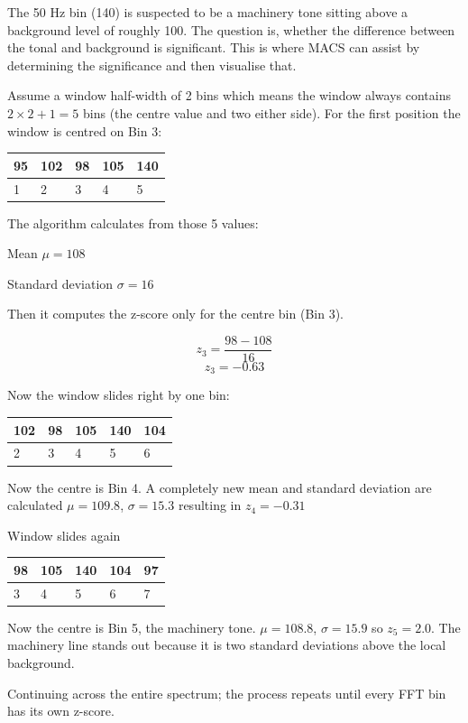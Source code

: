 The 50 Hz bin (140) is suspected to be a machinery tone sitting above a background level of roughly 100. The question is, whether the difference between the tonal and background is significant. This is where MACS can assist by determining the significance and then visualise that.

Assume a window half-width of 2 bins which means the window always contains $2 \times 2 + 1 = 5$ bins (the centre value and two either side). For the first position the window is centred on Bin 3:

 \begin{tabular}{lllll}
    95 & 102 & 98 & 105 & 140 \\
    \hline
    1 & 2 & 3 & 4 & 5
 \end{tabular}

The algorithm calculates from those 5 values:
\begin{compactitem}
    \item Mean $\mu = 108$
    \item Standard deviation $\sigma = 16$
\end{compactitem}

Then it computes the z-score only for the centre bin (Bin 3).

\[
z_{3} = \frac{98 - 108}{16}
\]
\[
z_{3} = -0.63
\] 

Now the window slides right by one bin:

 \begin{tabular}{lllll}
    102 & 98 & 105 & 140 & 104 \\
    \hline
    2 & 3 & 4 & 5 & 6
 \end{tabular}

Now the centre is Bin 4. A completely new mean and standard deviation are calculated $\mu = 109.8$, $\sigma = 15.3$ resulting in $z_{4} = -0.31$
 
Window slides again

 \begin{tabular}{lllll}
    98 & 105 & 140 & 104 & 97 \\
    \hline
    3 & 4 & 5 & 6 & 7
 \end{tabular}

Now the centre is Bin 5, the machinery tone. $\mu = 108.8$, $\sigma = 15.9$ so $z_5 = 2.0$. The machinery line stands out because it is two standard deviations above the local background.

Continuing across the entire spectrum; the process repeats until every FFT bin has its own z-score.

